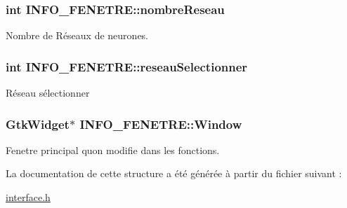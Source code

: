 \subsubsection[{\texorpdfstring{nombre\+Reseau}{nombreReseau}}]{\setlength{\rightskip}{0pt plus 5cm}int I\+N\+F\+O\+\_\+\+F\+E\+N\+E\+T\+R\+E\+::nombre\+Reseau}\hypertarget{structINFO__FENETRE_ab88f2bbddff749e8003f2b3178fd5602}{}\label{structINFO__FENETRE_ab88f2bbddff749e8003f2b3178fd5602}
Nombre de Réseaux de neurones. 
\subsubsection[{\texorpdfstring{reseau\+Selectionner}{reseauSelectionner}}]{\setlength{\rightskip}{0pt plus 5cm}int I\+N\+F\+O\+\_\+\+F\+E\+N\+E\+T\+R\+E\+::reseau\+Selectionner}\hypertarget{structINFO__FENETRE_a87ac81a3d0227737e3228bd5ad1f975d}{}\label{structINFO__FENETRE_a87ac81a3d0227737e3228bd5ad1f975d}
Réseau sélectionner 
\subsubsection[{\texorpdfstring{Window}{Window}}]{\setlength{\rightskip}{0pt plus 5cm}Gtk\+Widget$\ast$ I\+N\+F\+O\+\_\+\+F\+E\+N\+E\+T\+R\+E\+::\+Window}\hypertarget{structINFO__FENETRE_ad55c62f85a92f3163bca921dc73336dc}{}\label{structINFO__FENETRE_ad55c62f85a92f3163bca921dc73336dc}
Fenetre principal qu\textquotesingle{}on modifie dans les fonctions. 

La documentation de cette structure a été générée à partir du fichier suivant \+:\begin{DoxyCompactItemize}
\item 
\hyperlink{interface_8h}{interface.\+h}\end{DoxyCompactItemize}
